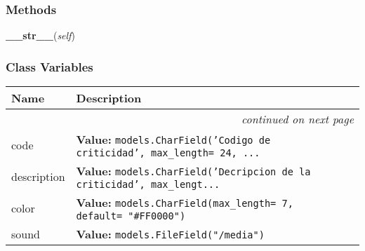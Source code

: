   \subsubsection{Methods}

    \label{GroundSegment:models:Alarm:Criticity:Criticity:__str__}

    \vspace{0.5ex}

\hspace{.8\funcindent}\begin{boxedminipage}{\funcwidth}

    \raggedright \textbf{\_\_str\_\_}(\textit{self})

\setlength{\parskip}{2ex}
\setlength{\parskip}{1ex}
    \end{boxedminipage}



  \subsubsection{Class Variables}

    \vspace{-1cm}
\hspace{\varindent}\begin{longtable}{|p{\varnamewidth}|p{\vardescrwidth}|l}
\cline{1-2}
\cline{1-2} \centering \textbf{Name} & \centering \textbf{Description}& \\
\cline{1-2}
\endhead\cline{1-2}\multicolumn{3}{r}{\small\textit{continued on next page}}\\\endfoot\cline{1-2}
\endlastfoot\raggedright c\-o\-d\-e\- & \raggedright \textbf{Value:} 
{\tt models.CharField('Codigo de criticidad', max\_length= 24, \texttt{...}}&\\
\cline{1-2}
\raggedright d\-e\-s\-c\-r\-i\-p\-t\-i\-o\-n\- & \raggedright \textbf{Value:} 
{\tt models.CharField('Decripcion de la criticidad', max\_lengt\texttt{...}}&\\
\cline{1-2}
\raggedright c\-o\-l\-o\-r\- & \raggedright \textbf{Value:} 
{\tt models.CharField(max\_length= 7, default= "\#FF0000")}&\\
\cline{1-2}
\raggedright s\-o\-u\-n\-d\- & \raggedright \textbf{Value:} 
{\tt models.FileField("/media")}&\\
\cline{1-2}
\end{longtable}

